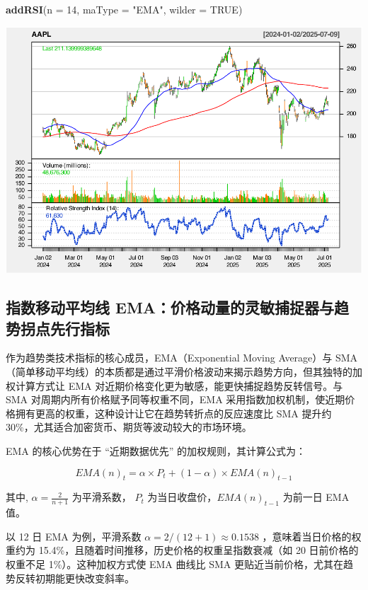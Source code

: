 \documentclass[]{ctexbook}
\newenvironment{Shaded}{\begin{snugshade}}{\end{snugshade}}
\newcommand{\AttributeTok}[1]{\textcolor[rgb]{0.13,0.29,0.53}{#1}}
\newcommand{\ConstantTok}[1]{\textcolor[rgb]{0.56,0.35,0.01}{#1}}
\newcommand{\DecValTok}[1]{\textcolor[rgb]{0.00,0.00,0.81}{#1}}
\newcommand{\FunctionTok}[1]{\textcolor[rgb]{0.13,0.29,0.53}{\textbf{#1}}}
\newcommand{\NormalTok}[1]{#1}
\newcommand{\StringTok}[1]{\textcolor[rgb]{0.31,0.60,0.02}{#1}}
\begin{document}
\begin{Shaded}
\begin{Highlighting}[]
\FunctionTok{addRSI}\NormalTok{(}\AttributeTok{n =} \DecValTok{14}\NormalTok{, }\AttributeTok{maType =} \StringTok{"EMA"}\NormalTok{, }\AttributeTok{wilder =} \ConstantTok{TRUE}\NormalTok{)}
\end{Highlighting}
\end{Shaded}

\includegraphics[width=0.9\linewidth]{quantmod_files/figure-latex/sma_2-4}

\subsection{指数移动平均线 EMA：价格动量的灵敏捕捉器与趋势拐点先行指标}\label{ux6307ux6570ux79fbux52a8ux5e73ux5747ux7ebf-emaux4ef7ux683cux52a8ux91cfux7684ux7075ux654fux6355ux6349ux5668ux4e0eux8d8bux52bfux62d0ux70b9ux5148ux884cux6307ux6807}

作为趋势类技术指标的核心成员，EMA（Exponential Moving Average）与 SMA（简单移动平均线）的本质都是通过平滑价格波动来揭示趋势方向，但其独特的加权计算方式让 EMA 对近期价格变化更为敏感，能更快捕捉趋势反转信号。与 SMA 对周期内所有价格赋予同等权重不同，EMA 采用指数加权机制，使近期价格拥有更高的权重，这种设计让它在趋势转折点的反应速度比 SMA 提升约 30\%，尤其适合加密货币、期货等波动较大的市场环境。

EMA 的核心优势在于 ``近期数据优先'' 的加权规则，其计算公式为：

\[
EMA(n)_t = \alpha \times P_t + (1-\alpha) \times EMA(n)_{t-1} 
\]

其中, \(\alpha = \frac{2}{n+1}\) 为平滑系数， \(P_t\) 为当日收盘价，\(EMA(n)_{t-1}\) 为前一日 EMA 值。

以 12 日 EMA 为例，平滑系数 \(\alpha = 2/(12+1) \approx 0.1538\) ，意味着当日价格的权重约为 15.4\%，且随着时间推移，历史价格的权重呈指数衰减（如 20 日前价格的权重不足 1\%）。这种加权方式使 EMA 曲线比 SMA 更贴近当前价格，尤其在趋势反转初期能更快改变斜率。
\end{document}
